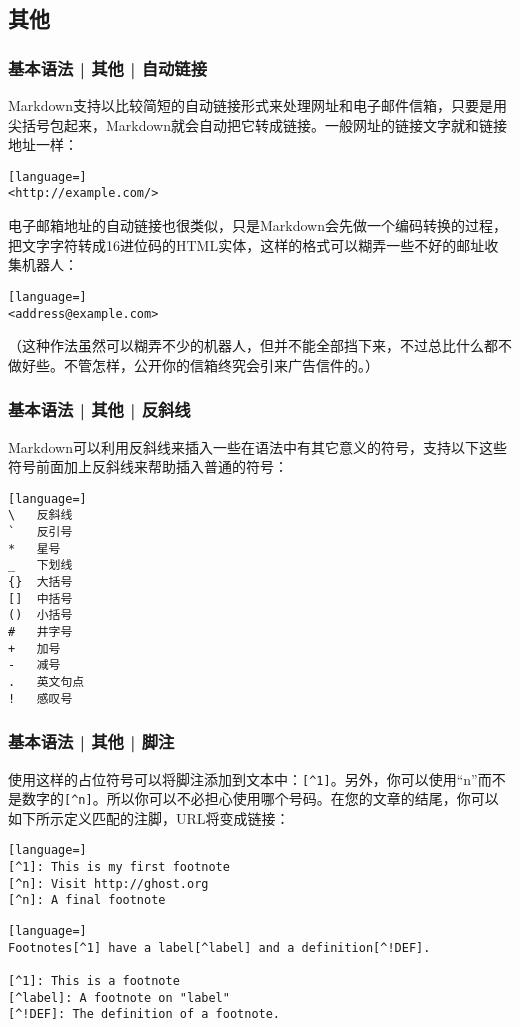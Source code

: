 \subsection{其他}
\begin{frame}[fragile]
  \frametitle{基本语法 | 其他 | \alert{自动链接}}
  Markdown支持以比较简短的自动链接形式来处理网址和电子邮件信箱，只要是用尖括号包起来，Markdown就会自动把它转成链接。一般网址的链接文字就和链接地址一样：
\begin{lstlisting}[language=]
<http://example.com/>
\end{lstlisting}
\pause
电子邮箱地址的自动链接也很类似，只是Markdown会先做一个编码转换的过程，把文字字符转成16进位码的HTML实体，这样的格式可以糊弄一些不好的邮址收集机器人：
\begin{lstlisting}[language=]
<address@example.com>
\end{lstlisting}
（这种作法虽然可以糊弄不少的机器人，但并不能全部挡下来，不过总比什么都不做好些。不管怎样，公开你的信箱终究会引来广告信件的。）
\end{frame}

\begin{frame}[fragile]
  \frametitle{基本语法 | 其他 | \alert{反斜线}}
Markdown可以利用反斜线来插入一些在语法中有其它意义的符号，支持以下这些符号前面加上反斜线来帮助插入普通的符号：
\begin{lstlisting}[language=]
\   反斜线
`   反引号
*   星号
_   下划线
{}  大括号
[]  中括号
()  小括号
#   井字号
+   加号
-   减号
.   英文句点
!   感叹号
\end{lstlisting}
\end{frame}

\begin{frame}[fragile]
  \frametitle{基本语法 | 其他 | \alert{脚注}}
使用这样的占位符号可以将脚注添加到文本中：\verb|[^1]|。另外，你可以使用“n”而不是数字的\verb|[^n]|。所以你可以不必担心使用哪个号码。在您的文章的结尾，你可以如下所示定义匹配的注脚，URL将变成链接：
\begin{lstlisting}[language=]
[^1]: This is my first footnote
[^n]: Visit http://ghost.org
[^n]: A final footnote
\end{lstlisting}
\begin{lstlisting}[language=]
Footnotes[^1] have a label[^label] and a definition[^!DEF].

[^1]: This is a footnote
[^label]: A footnote on "label"
[^!DEF]: The definition of a footnote.
\end{lstlisting}
\end{frame}


